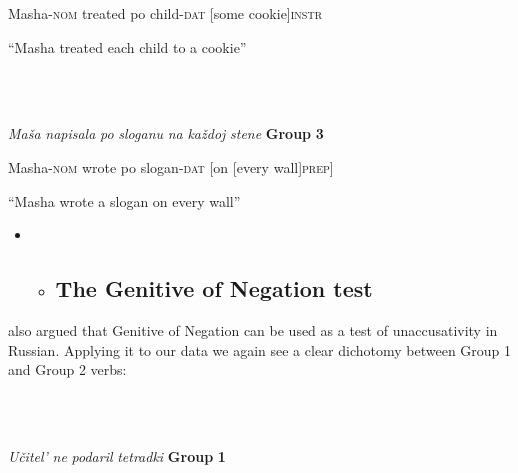 \documentclass[output=paper,modfonts, nonflat]{langsci/langscibook}
\begin{document}
\begin{styleinnerExample}
    Masha-\textsc{nom} treated   po child-\textsc{dat} [some       cookie]\textsc{instr}
\end{styleinnerExample}

\begin{styleinnerExample}
  “Masha treated each child to a cookie”
\end{styleinnerExample}

\begin{styleinnerExample}
\ea%
    \label{ex:key:24}
    \gll\\
        \\
    \glt
    \z

          \textit{Maša}             \textit{napisala} \textit{po} \textit{sloganu}        \textit{na}  \textit{každoj} \textit{stene}   \textbf{Group} \textbf{3}
\end{styleinnerExample}

\begin{styleinnerExample}
  Masha-\textsc{nom}   wrote     po slogan-\textsc{dat} [on [every  wall]\textsc{prep}]
\end{styleinnerExample}

\begin{styleinnerExample}
  “Masha wrote a slogan on every wall”
\end{styleinnerExample}

\begin{itemize}
\item \begin{itemize}
\item \subsection{The Genitive of Negation test}
\end{itemize}
\end{itemize}

\citet{Pesetsky1982} also argued that Genitive of Negation can be used as a test of unaccusativity in Russian. Applying it to our data we again see a clear dichotomy between Group 1 and Group 2 verbs:

\begin{styleinnerExample}
\ea%
    \label{ex:key:25}
    \gll\\
        \\
    \glt
    \z

          \textit{Učitel’}           \textit{ne}      \textit{podaril}     \textit{tetradki}   \textbf{Group} \textbf{1}
\end{styleinnerExample}
\end{document}

